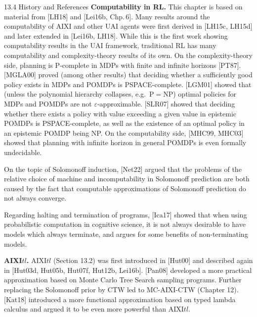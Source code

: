 \documentclass[aspectratio=169,10pt]{beamer}
\begin{document}
\begin{frame}[allowframebreaks]{13.4 History and References}
  \textbf{Computability in RL.} This chapter is based on material from
  [LH18] and [Lei16b, Chp.\,6]. Many results around the computability of
  AIXI and other UAI agents were first derived in [LH15c, LH15d] and later
  extended in [Lei16b, LH18]. While this is the first work showing
  computability results in the UAI framework, traditional RL has many
  computability and complexity-theory results of its own. On the
  complexity-theory side, planning is P-complete in MDPs with finite and
  infinite horizons [PT87]. [MGLA00] proved (among other results) that
  deciding whether a sufficiently good policy exists in MDPs and POMDPs is
  PSPACE-complete. [LGM01] showed that (unless the polynomial hierarchy
  collapses, e.g.\ P$=$NP) optimal policies for MDPs and POMDPs are not
  $\varepsilon$-approximable. [SLR07] showed that deciding whether there
  exists a policy with value exceeding a given value in epistemic POMDPs is
  PSPACE-complete, as well as the existence of an optimal policy in an
  epistemic POMDP being NP. On the computability side, [MHC99, MHC03] showed
  that planning with infinite horizon in general POMDPs is even formally
  undecidable.

  \bigskip
  On the topic of Solomonoff induction, [Net22] argued that the problems of
  the relative choice of machine and incomputability in Solomonoff
  prediction are both caused by the fact that computable approximations of
  Solomonoff prediction do not always converge.

  \bigskip
  Regarding halting and termination of programs, [Ica17] showed that when
  using probabilistic computation in cognitive science, it is not always
  desirable to have models which always terminate, and argues for some
  benefits of non-terminating models.

  \framebreak

  \textbf{AIXI$tl$.} AIXI$tl$ (Section 13.2) was first introduced in
  [Hut00] and described again in [Hut03d, Hut05b, Hut07f, Hut12b, Lei16b].
  [Pan08] developed a more practical approximation based on Monte Carlo Tree
  Search sampling programs. Further replacing the Solomonoff prior by CTW
  led to MC-AIXI-CTW (Chapter 12). [Kat18] introduced a more functional
  approximation based on typed lambda calculus and argued it to be even
  more powerful than AIXI$tl$.
\end{frame}
\end{document}

